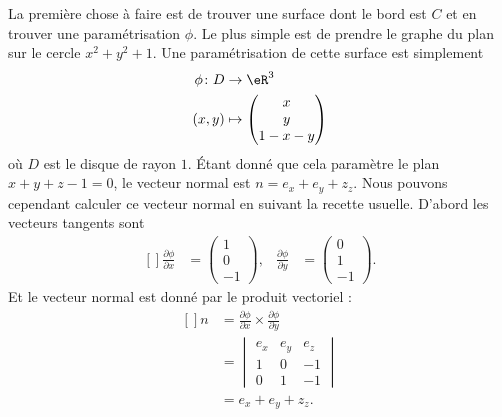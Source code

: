 \begin{example}
    La première chose à faire est de trouver une surface dont le bord est $C$ et en trouver une paramétrisation $\phi$. Le plus simple est de prendre le graphe du plan sur le cercle $x^2+y^2+1$. Une paramétrisation de cette surface est simplement
    \begin{equation}
        \begin{aligned}
            \phi\colon D&\to \eR^3 \\
            (x,y)&\mapsto \begin{pmatrix}
                x    \\
                y    \\
                1-x-y
            \end{pmatrix}
        \end{aligned}
    \end{equation}
    où $D$ est le disque de rayon $1$. Étant donné que cela paramètre le plan $x+y+z-1=0$, le vecteur normal est $n=e_x+e_y+z_z$. Nous pouvons cependant calculer ce vecteur normal en suivant la recette usuelle. D'abord les vecteurs tangents sont
    \begin{equation}
        \begin{aligned}[]
            \frac{ \partial \phi }{ \partial x }&=\begin{pmatrix}
                1    \\
                0    \\
                -1
            \end{pmatrix},
            &\frac{ \partial \phi }{ \partial y }&=\begin{pmatrix}
                0    \\
                1    \\
                -1
            \end{pmatrix}.
        \end{aligned}
    \end{equation}
    Et le vecteur normal est donné par le produit vectoriel :
    \begin{equation}
        \begin{aligned}[]
            n&=\frac{ \partial \phi }{ \partial x }\times\frac{ \partial \phi }{ \partial y }\\
            &=\begin{vmatrix}
                e_x    &   e_y    &   e_z    \\
                1    &   0    &   -1    \\
                0    &   1    &   -1
            \end{vmatrix}\\
            &=e_x+e_y+z_z.
        \end{aligned}
    \end{equation}


\end{example}
